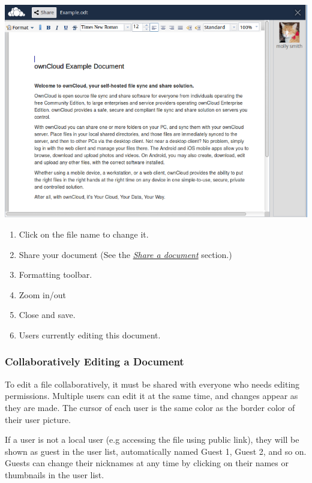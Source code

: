 \documentclass[letterpaper,10pt,english]{sphinxmanual}
\begin{document}
\includegraphics{oc_documents_edit.png}
\begin{enumerate}
\item {} 
Click on the file name to change it.

\item {} 
Share your document (See the {\hyperref[documents:share-a-document]{\emph{Share a document}}} section.)

\item {} 
Formatting toolbar.

\item {} 
Zoom in/out

\item {} 
Close and save.

\item {} 
Users currently editing this document.

\end{enumerate}


\subsubsection{Collaboratively Editing a Document}
\label{documents:collaboratively-editing-a-document}
To edit a file collaboratively, it must be shared with everyone who needs
editing permissions. Multiple users can edit it at the same time, and changes
appear as they are made. The cursor of each user is the same color as the
border color of their user picture.

If a user is not a local user (e.g accessing the file using public link), they
will be shown as guest in the user list, automatically named Guest 1, Guest 2,
and so on. Guests can change their nicknames at any time by clicking on their
names or thumbnails in the user list.
\end{document}
